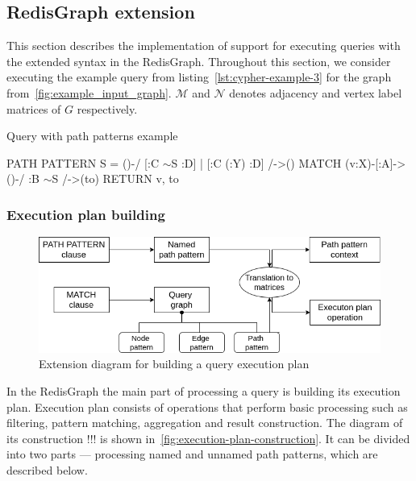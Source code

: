 \subsection{RedisGraph extension}
This section describes the implementation of support for executing queries with the extended syntax in the RedisGraph. Throughout this section, we consider executing the example query from listing~\autoref{lst:cypher-example-3} for the graph from~\autoref{fig:example_input_graph}. $\mathcal{M}$ and $\mathcal{N}$ denotes adjacency and vertex label matrices of $G$ respectively. 

\begin{algorithm}
\begin{algorithmic}[1]
\caption{Query with path patterns example}
\label{lst:cypher-example-3}
\State PATH PATTERN S = ()-/ [:C $\sim$S :D] | [:C (:Y) :D] /->()
\State MATCH (v:X)-[:A]->()-/ :B $\sim$S /->(to)
\State RETURN v, to
\end{algorithmic}
\end{algorithm}

\subsubsection{Execution plan building}
\begin{figure}[h]
  \centering
  \includegraphics[width=\linewidth]{execution-plan-building.png}
  \caption{Extension diagram for building a query execution plan}
  \label{fig:execution-plan-construction}
\end{figure}

In the RedisGraph the main part of processing a query is building its execution plan. Execution plan consists of operations that perform basic processing such as filtering, pattern matching, aggregation and result construction. The diagram of its construction !!! is shown in~\autoref{fig:execution-plan-construction}. It can be divided into two parts --- processing named and unnamed path patterns, which are described below.


